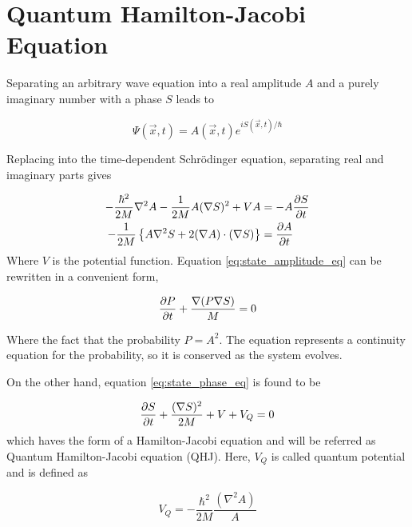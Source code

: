 \section{Quantum Hamilton-Jacobi Equation}
\label{sec:QHJ}
Separating an arbitrary wave equation into a real amplitude $A$ and a purely imaginary number with a phase $S$ leads to

\begin{equation}
    \Psi(\vec x, t) = A(\vec x, t)e^{iS(\vec x, t)/\hbar}
\end{equation}

Replacing into the time-dependent Schrödinger equation, separating real and imaginary parts gives

\begin{align}
    -\dfrac{\hbar^2}{2M}\nabla^2 A - \dfrac{1}{2M}A(\mathbf{\nabla} S)^2 + VA &= -A\frac{\partial S}{\partial t} \label{eq:state_phase_eq}\\
    -\dfrac{1}{2M}\left\{A\nabla^2 S + 2 (\nabla A)\cdot(\nabla S)\right\} &= \frac{\partial A}{\partial t} \label{eq:state_amplitude_eq}
\end{align}
Where $V$ is the potential function.
Equation \eqref{eq:state_amplitude_eq} can be rewritten in a convenient form,

\begin{equation}
    \frac{\partial P}{\partial t} + \dfrac{\nabla(P\nabla S)}{M} = 0
\end{equation}

Where the fact that the probability $P = A^2$. The equation represents a continuity equation for the probability, so it is conserved as the system evolves.

On the other hand, equation \eqref{eq:state_phase_eq} is found to be

\begin{equation}
    \frac{\partial S}{\partial t} + \dfrac{(\nabla S)^2}{2M} + V + V_Q = 0
    \label{eq:}
\end{equation}
which haves the form of a Hamilton-Jacobi equation and will be referred as Quantum Hamilton-Jacobi equation (QHJ). Here, $V_Q$ is called quantum potential and is defined as

\begin{equation}
    V_Q = -\dfrac{\hbar^2}{2M}\dfrac{(\nabla^2 A)}{A}
\end{equation}
